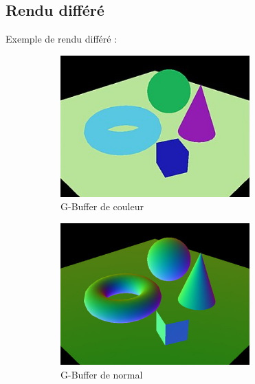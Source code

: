 \subsection{Rendu différé}
\label{sec:deferred_rendering}
Exemple de rendu différé :
\begin{figure}[h]
    \begin{subfigure}{0.5\textwidth}
        \centering
        \includegraphics[width=0.8\textwidth]{images/Deferred_rendering_pass_col.jpg}
        \caption{G-Buffer de couleur}
        \label{fig:drendering_pass_col}
    \end{subfigure}
    \begin{subfigure}{0.5\textwidth}
        \centering
        \includegraphics[width=0.8\textwidth]{images/Deferred_rendering_pass_nor.jpg}
        \caption{G-Buffer de normal}
        \label{fig:drendering_pass_normal}
    \end{subfigure}
    \begin{subfigure}{0.5\textwidth}
        \centering

\end{subfigure}
\end{figure}
